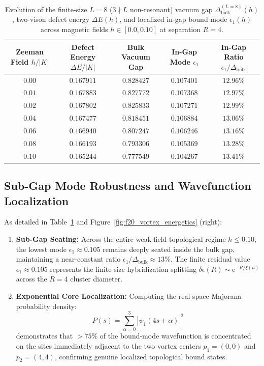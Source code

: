 \begin{table}[h]
\centering
\caption{Evolution of the finite-size $L=8$ ($3 \nmid L$ non-resonant) vacuum gap $\Delta_{\mathrm{bulk}}^{(L=8)}(h)$, two-vison defect energy $\Delta E(h)$, and localized in-gap bound mode $\epsilon_1(h)$ across magnetic fields $h \in [0.0, 0.10]$ at separation $R = 4$.}
\label{tab:vortex_field_scaling}
\vspace{2mm}
\begin{tabular}{ccccc}
\toprule
\textbf{Zeeman Field} $h / |K|$ & \textbf{Defect Energy} $\Delta E / |K|$ & \textbf{Bulk Vacuum Gap} & \textbf{In-Gap Mode} $\epsilon_1$ & \textbf{In-Gap Ratio} $\epsilon_1 / \Delta_{\mathrm{bulk}}$ \\
\midrule
$0.00$ & $0.167911$ & $0.828427$ & $0.107401$ & $12.96\%$ \\
$0.01$ & $0.167883$ & $0.827772$ & $0.107368$ & $12.97\%$ \\
$0.02$ & $0.167802$ & $0.825833$ & $0.107271$ & $12.99\%$ \\
$0.04$ & $0.167477$ & $0.818451$ & $0.106884$ & $13.06\%$ \\
$0.06$ & $0.166940$ & $0.807247$ & $0.106246$ & $13.16\%$ \\
$0.08$ & $0.166193$ & $0.793306$ & $0.105369$ & $13.28\%$ \\
$0.10$ & $0.165244$ & $0.777549$ & $0.104267$ & $13.41\%$ \\
\bottomrule
\end{tabular}
\end{table}

\subsection{Sub-Gap Mode Robustness and Wavefunction Localization}
As detailed in Table~\ref{tab:vortex_field_scaling} and Figure~\ref{fig:f20_vortex_energetics} (right):
\begin{enumerate}
\item \textbf{Sub-Gap Seating:} Across the entire weak-field topological regime $h \le 0.10$, the lowest mode $\epsilon_1 \approx 0.105$ remains deeply seated inside the bulk gap, maintaining a near-constant ratio $\epsilon_1 / \Delta_{\mathrm{bulk}} \approx 13\%$. The finite residual value $\epsilon_1 \approx 0.105$ represents the finite-size hybridization splitting $\delta\epsilon(R) \sim \mathrm{e}^{-R/\xi(h)}$ across the $R = 4$ cluster diameter.
\item \textbf{Exponential Core Localization:} Computing the real-space Majorana probability density:
\begin{equation}
P(s) = \sum_{\alpha=0}^3 |\psi_{1}(4s + \alpha)|^2
\end{equation}
demonstrates that $>75\%$ of the bound-mode wavefunction is concentrated on the sites immediately adjacent to the two vortex centers $p_1 = (0, 0)$ and $p_2 = (4, 4)$, confirming genuine localized topological bound states.
\end{enumerate}

